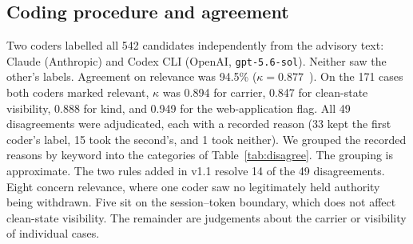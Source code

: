 \documentclass[preprint,12pt]{elsarticle}
\begin{document}
\subsection{Coding procedure and agreement}
Two coders labelled all 542 candidates independently from the advisory text: Claude (Anthropic) and
Codex CLI (OpenAI, \texttt{gpt-5.6-sol}). Neither saw the other's labels. Agreement on relevance was
94.5\% ($\kappa=0.877$~\cite{cohen1960kappa}). On the 171 cases both coders marked relevant, $\kappa$ was
0.894 for carrier, 0.847 for clean-state visibility, 0.888 for kind, and 0.949 for the web-application flag. All 49
disagreements were adjudicated, each with a recorded reason (33 kept the first coder's label, 15 took the
second's, and 1 took neither). We grouped the recorded reasons by keyword into the categories of Table~\ref{tab:disagree}. The grouping is
approximate. The two rules added in v1.1 resolve 14 of the 49 disagreements. Eight concern relevance, where one coder
saw no legitimately held authority being withdrawn. Five sit on the session--token boundary, which does not affect
clean-state visibility. The remainder are judgements about the carrier or visibility of individual cases.
\end{document}
